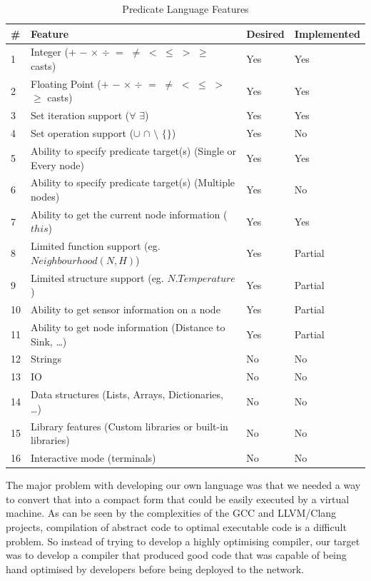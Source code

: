 \begin{table}[H]
\centering
\begin{tabular}{| l | l | l | l |}
\hline
\# & Feature & Desired & Implemented \\
\hline
1 & Integer ($+$ $-$ $\times$ $\div$ $=$ $\neq$ $<$ $\leq$ $>$ $\geq$ casts) & Yes & Yes \\
2 & Floating Point ($+$ $-$ $\times$ $\div$ $=$ $\neq$ $<$ $\leq$ $>$ $\geq$ casts) & Yes & Yes \\

3 & Set iteration support ($\forall$ $\exists$) & Yes & Yes \\
4 & Set operation support ($\cup$ $\cap$ $\setminus$ $\{\}$) & Yes & No \\

5 & Ability to specify predicate target(s) (Single or Every node) & Yes & Yes \\
6 & Ability to specify predicate target(s) (Multiple nodes) & Yes & No \\

7 & Ability to get the current node information ($this$) & Yes & Yes \\

8 & Limited function support (eg. $Neighbourhood(N, H)$) & Yes & Partial \\
9 & Limited structure support (eg. $N.Temperature$) & Yes & Partial \\

10 & Ability to get sensor information on a node & Yes & Partial \\
11 & Ability to get node information (Distance to Sink, \ldots) & Yes & Partial \\

12 & Strings & No & No \\
13 & IO & No & No \\

14 & Data structures (Lists, Arrays, Dictionaries, \ldots) & No & No \\
15 & Library features (Custom libraries or built-in libraries) & No & No \\
16 & Interactive mode (terminals) & No & No \\
\hline
\end{tabular}
\caption{Predicate Language Features}
\label{tab:language-requirements}
\end{table}

The major problem with developing our own language was that we needed a way to convert that into a compact form that could be easily executed by a virtual machine. As can be seen by the complexities of the GCC and LLVM/Clang projects, compilation of abstract code to optimal executable code is a difficult problem. So instead of trying to develop a highly optimising compiler, our target was to develop a compiler that produced good code that was capable of being hand optimised by developers before being deployed to the network.

